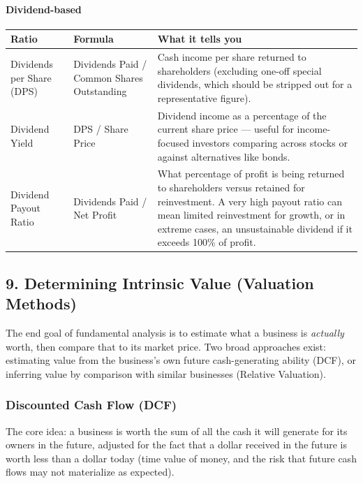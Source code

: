\documentclass[12pt,openany]{book}
\begin{document}
\paragraph{Dividend-based} 

\begingroup
\small
\setlength{\tabcolsep}{4pt}
\begin{center}\begin{tabular}{|L{0.22\textwidth}|L{0.24\textwidth}|L{0.42\textwidth}|}
\hline
\textbf{Ratio} & \textbf{Formula} & \textbf{What it tells you} \\
\hline
Dividends per Share (DPS) & Dividends Paid / Common Shares Outstanding & Cash income per share returned to shareholders (excluding one-off special dividends, which should be stripped out for a representative figure). \\
\hline
Dividend Yield & DPS / Share Price & Dividend income as a percentage of the current share price --- useful for income-focused investors comparing across stocks or against alternatives like bonds. \\
\hline
Dividend Payout Ratio & Dividends Paid / Net Profit & What percentage of profit is being returned to shareholders versus retained for reinvestment. A very high payout ratio can mean limited reinvestment for growth, or in extreme cases, an unsustainable dividend if it exceeds 100\% of profit. \\
\hline
\end{tabular}\end{center}
\endgroup

\subsection{9. Determining Intrinsic Value (Valuation Methods)}

The end goal of fundamental analysis is to estimate what a business is \emph{actually} worth, then compare that to its market price. Two broad approaches exist: estimating value from the business's own future cash-generating ability (DCF), or inferring value by comparison with similar businesses (Relative Valuation).

\subsubsection{Discounted Cash Flow (DCF)}

The core idea: a business is worth the sum of all the cash it will generate for its owners in the future, adjusted for the fact that a dollar received in the future is worth less than a dollar today (time value of money, and the risk that future cash flows may not materialize as expected).
\end{document}
